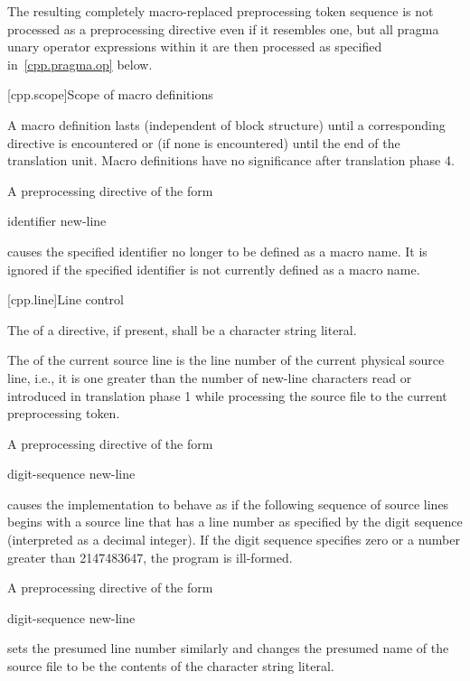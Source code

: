 \pnum
The resulting completely macro-replaced preprocessing token sequence
is not processed as a preprocessing directive even if it resembles one,
but all pragma unary operator expressions within it are then processed as
specified in~\ref{cpp.pragma.op} below.

[cpp.scope]{Scope of macro definitions}%
%

\pnum
A macro definition lasts
(independent of block structure)
until a corresponding
directive is encountered or
(if none is encountered)
until the end of the translation unit.
Macro definitions have no significance after translation phase 4.

\pnum
A preprocessing directive of the form
\begin{ncsimplebnf}
 identifier new-line
%
\end{ncsimplebnf}
causes the specified identifier no longer to be defined as a macro name.
It is ignored if the specified identifier is not currently defined as
a macro name.


[cpp.line]{Line control}%
%

\pnum
The  of a
directive, if present,
shall be a character string literal.

\pnum
The
of the current source line is
the line number of the current physical source line,
i.e., it is one greater than
the number of new-line characters read or introduced
in translation phase 1
while processing the source file to the current preprocessing token.

\pnum
A preprocessing directive of the form
\begin{ncsimplebnf}
 digit-sequence new-line
\end{ncsimplebnf}
causes the implementation to behave as if
the following sequence of source lines begins with a
source line that has a line number as specified
by the digit sequence (interpreted as a decimal integer).
If the digit sequence specifies zero
or a number greater than 2147483647,
the program is ill-formed.

\pnum
A preprocessing directive of the form
\begin{ncsimplebnf}
 digit-sequence    new-line
\end{ncsimplebnf}
sets the presumed line number similarly and changes the
presumed name of the source file to be the contents
of the character string literal.

